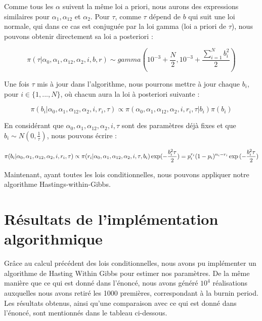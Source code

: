 \documentclass[
]{article}
\begin{document}
Comme tous les \(\alpha\) suivent la même loi a priori, nous aurons des
expressions similaires pour \(\alpha_1, \alpha_{12}\) et \(\alpha_2\).
Pour \(\tau\), comme \(\tau\) dépend de \(b\) qui suit une loi normale,
qui dans ce cas est conjuguée par la loi gamma (loi a priori de
\(\tau\)), nous pouvons obtenir directement sa loi a posteriori :

\[
  \pi(\tau|\alpha_0, \alpha_{1}, \alpha_{12},\alpha_2, i , b, r) \sim gamma(10^{-3} + \frac{N}{2}, 10^{-3} + \frac{\sum_{i=1}^Nb_i^2}{2})
\]

Une fois \(\tau\) mis à jour dans l'algorithme, nous pourrons mettre à
jour chaque \(b_i\), pour \(i \in \{1, ..., N\}\), où chacun aura la loi
à posteriori suivante :

\[
  \pi(b_i| \alpha_0, \alpha_{1}, \alpha_{12},\alpha_2, i , r_i, \tau) \propto \pi( \alpha_0, \alpha_{1}, \alpha_{12},\alpha_2, i , r_i, \tau| b_i)\pi(b_i)
\]

En considérant que
\(\alpha_0, \alpha_{1}, \alpha_{12},\alpha_2, i, \tau\) sont des
paramètres déjà fixes et que \(b_i \sim N(0,\frac{1}{\tau})\), nous
pouvons écrire :

\[
  \pi(b_i| \alpha_0, \alpha_{1}, \alpha_{12},\alpha_2, i , r_i, \tau) \propto \pi(r_i|\alpha_0, \alpha_{1}, \alpha_{12},\alpha_2, i , \tau, b_i)\exp(-\frac{b_i^2\tau}{2}) \\
  =p_i^{r_i}(1-p_i)^{n_i-r_i}\exp{(-\frac{b_i^2\tau}{2})}
\]

Maintenant, ayant toutes les lois conditionnelles, nous pouvons
appliquer notre algorithme Hastings-within-Gibbs.

\hypertarget{ruxe9sultats-de-limpluxe9mentation-algorithmique}{%
\section{Résultats de l'implémentation
algorithmique}\label{ruxe9sultats-de-limpluxe9mentation-algorithmique}}

Grâce au calcul précédent des lois conditionnelles, nous avons pu
implémenter un algorithme de Hasting Within Gibbs pour estimer nos
paramètres. De la même manière que ce qui est donné dans l'énoncé, nous
avons généré \(10^4\) réalisations auxquelles nous avons retiré les 1000
premières, correspondant à la burnin period. Les résultats obtenus,
ainsi qu'une comparaison avec ce qui est donné dans l'énoncé, sont
mentionnés dans le tableau ci-dessous.
\end{document}
